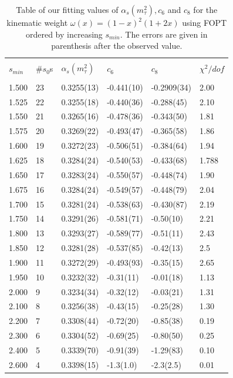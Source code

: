 \documentclass[../../index.tex]{subfiles}
\begin{document}
\begin{table}[H]
  \centering
  \begin{tabular}{llllll}
    \toprule \\
    $s_{min}$ & \#$s_0$s & $\alpha_s(m_\tau^2)$ & $c_6$ & $c_8$ & $\chi^2/dof$  \\
    \hline \\
    1.500 & 23 & 0.3255(13) & -0.441(10) & -0.2909(34) & 2.00  \\
    1.525 & 22 & 0.3255(18) & -0.440(36) & -0.288(45) & 2.10 \\
    1.550 & 21 & 0.3265(16) & -0.478(36) & -0.343(50) & 1.81 \\
    1.575 & 20 & 0.3269(22) & -0.493(47) & -0.365(58) & 1.86 \\
    1.600 & 19 & 0.3272(23) & -0.506(51) & -0.384(64) & 1.94 \\
    1.625 & 18 & 0.3284(24) & -0.540(53) & -0.433(68) & 1.788 \\
    1.650 & 17 & 0.3283(24) & -0.550(57) & -0.448(74) & 1.90 \\
    1.675 & 16 & 0.3284(24) & -0.549(57) & -0.448(79) & 2.04 \\
    1.700 & 15 & 0.3281(24) & -0.538(63) & -0.430(87) & 2.19 \\
    1.750 & 14 & 0.3291(26) & -0.581(71) & -0.50(10) & 2.21 \\
    1.800 & 13 & 0.3293(27) & -0.589(77) & -0.51(11) & 2.43 \\
    1.850 & 12 & 0.3281(28) & -0.537(85) & -0.42(13) & 2.5 \\
    1.900 & 11 & 0.3272(29) & -0.493(93) & -0.35(15) & 2.65 \\
    1.950 & 10 & 0.3232(32) & -0.31(11) & -0.01(18) & 1.13 \\
    2.000 & 9 & 0.3234(34) & -0.32(12) & -0.03(21) & 1.31 \\
    2.100 & 8 & 0.3256(38) & -0.43(15) & -0.25(28) & 1.30 \\
    2.200 & 7 & 0.3308(44) & -0.72(20) & -0.85(38) & 0.19 \\
    2.300 & 6 & 0.3304(52) & -0.69(25) & -0.80(50) & 0.25 \\
    2.400 & 5 & 0.3339(70) & -0.91(39) & -1.29(83) & 0.10 \\
    2.600 & 4 & 0.3398(15) & -1.3(1.0) & -2.3(2.5) & 0.01  \\
    \bottomrule
  \end{tabular}
  \caption{Table of our fitting values of $\alpha_s(m_\tau^2), c_6$ and $c_8$ for the kinematic weight
    $\omega(x)=(1-x)^2(1+2x)$ using FOPT ordered by increasing $s_{min}$. The
    errors are given in parenthesis after the observed value.}
  \label{table:fitWKinAlD6D8}
\end{table}
\end{document}
